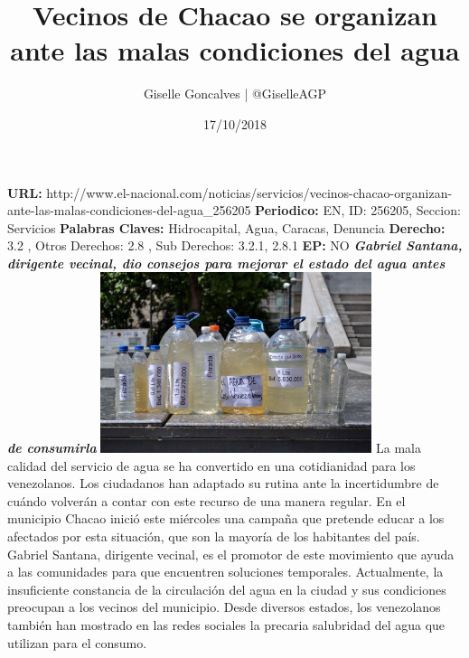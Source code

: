 \documentclass{article}%
\title{\textbf{Vecinos de Chacao se organizan ante las malas condiciones del agua}}%
\author{Giselle Goncalves | @GiselleAGP}%
\date{17/10/2018}%
\begin{document}
%
\normalsize%
\maketitle%
\textbf{URL: }%
http://www.el{-}nacional.com/noticias/servicios/vecinos{-}chacao{-}organizan{-}ante{-}las{-}malas{-}condiciones{-}del{-}agua\_256205\newline%
%
\textbf{Periodico: }%
EN, %
ID: %
256205, %
Seccion: %
Servicios\newline%
%
\textbf{Palabras Claves: }%
Hidrocapital, Agua, Caracas, Denuncia\newline%
%
\textbf{Derecho: }%
3.2%
, Otros Derechos: %
2.8%
, Sub Derechos: %
3.2.1, 2.8.1%
\newline%
%
\textbf{EP: }%
NO\newline%
\newline%
%
\textbf{\textit{Gabriel Santana, dirigente vecinal, dio consejos para mejorar el estado del agua antes de consumirla}}%
\newline%
\newline%
%
\includegraphics[width=300px]{54.jpg}%
\newline%
%
La mala calidad del servicio de agua se ha convertido en una cotidianidad para los venezolanos. Los ciudadanos han adaptado su rutina ante la incertidumbre de cuándo volverán a contar con este recurso de una manera regular.%
\newline%
%
En el municipio Chacao inició este miércoles una campaña que pretende educar a los afectados por esta situación, que son la mayoría de los habitantes del país. Gabriel Santana, dirigente vecinal, es el promotor de este movimiento que ayuda a las comunidades para que encuentren soluciones temporales.%
\newline%
%
Actualmente, la insuficiente constancia de la circulación del agua en la ciudad y sus condiciones preocupan a los vecinos del municipio. Desde diversos estados, los venezolanos también han mostrado en las redes sociales la precaria salubridad del agua que utilizan para el consumo.%
\end{document}
